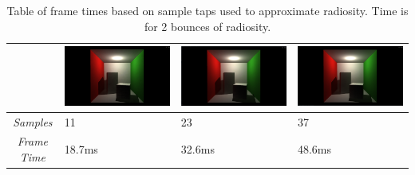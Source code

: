\begin{table}[!ht]
\begin{center}
\begin{tabular}{| c | p{3.5cm} | p{3.5cm} | p{3.5cm} |}
\hline
&
\includegraphics[scale=0.1,trim=0 0 0 -5]{img/results/radiosity/11samples} &
\includegraphics[scale=0.1,trim=0 0 0 -5]{img/results/radiosity/23samples} &
\includegraphics[scale=0.1,trim=0 0 0 -5]{img/results/radiosity/37samples} \\
\hline
\emph{Samples} & 11 & 23 & 37 \\
\hline
\emph{Frame Time} & 18.7ms & 32.6ms & 48.6ms\\
\hline
\end{tabular}
\caption{Table of frame times based on sample taps used to approximate radiosity. Time is for 2 bounces of radiosity.}
\label{table-rad-samples}
\end{center}
\end{table}

